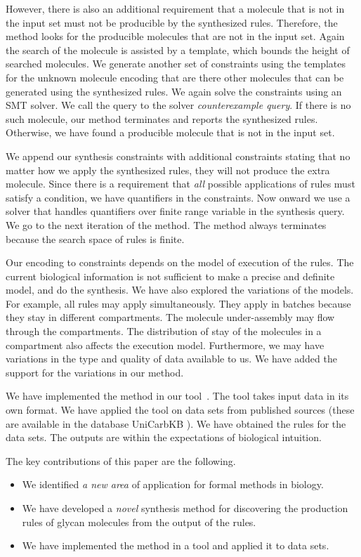 However, there is also an additional requirement that a molecule
that is not in the input set must not be producible by the synthesized rules.
Therefore, the method looks for the producible molecules that are not in the input set.
Again the search of the molecule is assisted by a template, which bounds the height
of searched molecules.
We generate another set of constraints using the templates for the unknown molecule encoding that
are there other molecules that can be generated using the synthesized rules.
We again solve the constraints using an SMT solver.
We call the query to the solver {\em counterexample query}.
If there is no such molecule, our method terminates and reports
the synthesized rules.
Otherwise, we have found a producible molecule that is not in the input set.

We append our synthesis constraints with additional constraints stating that
no matter how we apply the synthesized rules, they will not produce the extra molecule.
Since there is a requirement that {\em all} possible applications of rules must satisfy
a condition, we have quantifiers in the constraints.
Now onward we use a solver that handles quantifiers over finite range variable in
the synthesis query.
We go to the next iteration of the method.
The method always terminates because the search space of rules is finite.

Our encoding to constraints depends on the model of execution of the rules.
The current biological information is not sufficient to make a precise
and definite model, and do the synthesis.
We have also explored the variations of the models. For example, all rules
may apply simultaneously. They apply in batches because they
stay in different compartments.
The molecule under-assembly may flow through the compartments.
The distribution of stay of the molecules in a compartment also affects
the execution model.
Furthermore, we may have variations in the type and quality of data available to us.
We have added the support for the variations in our method.

We have implemented the method in our tool~\ourtool. The tool takes input data in its own format.
We have applied the tool on data sets from published sources (these are available in the database UniCarbKB \cite{Campbell2013}).
We have obtained the rules for the data sets.
The outputs are within the expectations of biological
intuition.

The key contributions of this paper are the following.
\begin{itemize}
\item We identified {\em a new area} of application for formal methods in biology.
\item We have developed a {\em novel} synthesis method for discovering the production rules of glycan molecules from the output of the rules.
\item We have implemented the method in a tool and applied it to data sets.
\end{itemize}


